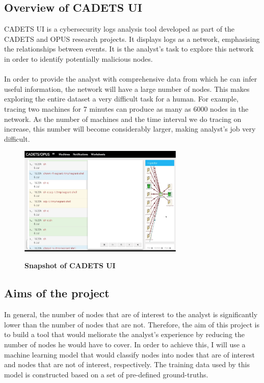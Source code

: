 	\subsection{Overview of CADETS UI}\label{1.1.1}
	CADETS UI is a cybersecurity logs analysis tool developed as part of the CADETS and OPUS research projects. It displays logs as a network, emphasising the relationships between events. It is the analyst's task to explore this network in order to identify potentially malicious nodes.
	\\ \\
	In order to provide the analyst with comprehensive data from which he can infer useful information, the network will have a large number of nodes. This makes exploring the entire dataset a very difficult task for a human.  For example, tracing two machines for 7 minutes can produce as many as 6000 nodes in the network.  As the number of machines and the time interval we do tracing on increase, this number will become considerably larger, making analyst's job very difficult. 
	\begin{figure}[H]
		\caption{\bf Snapshot of CADETS UI}
		\centering
		\includegraphics[width=0.7\textwidth]{graphics/CADETS}
		\label{Figure 1.1}
	\end{figure}
	
	\subsection{Aims of the project}
	In general, the number of nodes that are of interest to the analyst is significantly lower than the number of nodes that are not. Therefore, the aim of this project is to build a tool that would meliorate the analyst's experience by reducing the number of nodes he would have to cover. In order to achieve this, I will use a machine learning model that would classify nodes into nodes that are of interest and nodes that are not of interest, respectively. The training data used by this model is constructed based on a set of pre-defined ground-truths. 
	
